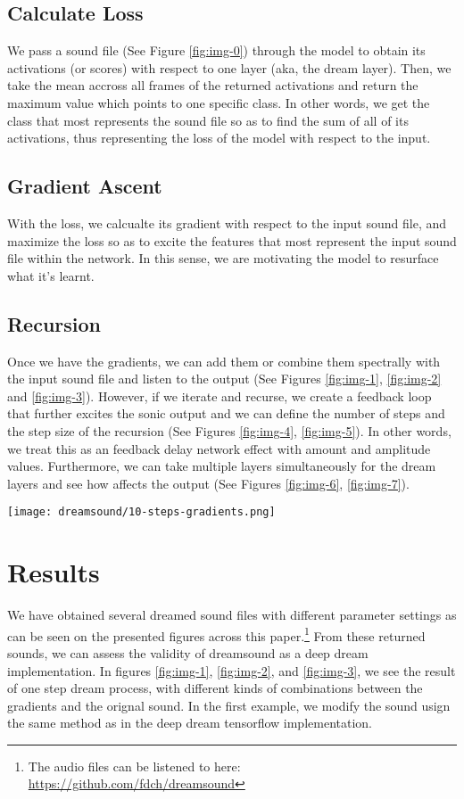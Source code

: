 \documentclass[a4paper,10pt,oneside]{article}
\begin{document}
\begin{sloppy}
\subsection{Calculate Loss}
We pass a sound file (See Figure \ref{fig:img-0}) through the model to obtain its activations (or scores) with respect to one layer (aka, the dream layer). Then, we take the mean accross all frames of the returned activations and return the maximum value which points to one specific class. In other words, we get the class that most represents the sound file so as to find the sum of all of its activations, thus representing the loss of the model with respect to the input.



\subsection{Gradient Ascent}
With the loss, we calcualte its gradient with respect to the input sound file, and maximize the loss so as to excite the features that most represent the input sound file within the network. In this sense, we are motivating the model to resurface what it's learnt. 


\subsection{Recursion}
Once we have the gradients, we can add them or combine them spectrally with the input sound file and listen to the output (See Figures \ref{fig:img-1}, \ref{fig:img-2} and \ref{fig:img-3}). However, if we iterate and recurse, we create a feedback loop that further excites the sonic output and we can define the number of steps and the step size of the recursion (See Figures \ref{fig:img-4}, \ref{fig:img-5}). In other words, we treat this as an feedback delay network effect with amount and amplitude values. Furthermore, we can take multiple layers simultaneously for the dream layers and see how affects the output (See Figures \ref{fig:img-6}, \ref{fig:img-7}).

\begin{figure*}[htbp]
       \centering
              \texttt{[image: dreamsound/10-steps-gradients.png]}
       \caption{Recursively passing the gradients for 10 steps.}
       \label{fig:img-4}
\end{figure*}

\section{Results}
We have obtained several dreamed sound files with different parameter settings as can be seen on the presented figures across this paper.\footnote{The audio files can be listened to here: \url{https://github.com/fdch/dreamsound}} From these returned sounds, we can assess the validity of dreamsound as a deep dream implementation. In figures \ref{fig:img-1}, \ref{fig:img-2}, and \ref{fig:img-3}, we see the result of one step dream process, with different kinds of combinations between the gradients and the orignal sound. In the first example, we modify the sound usign the same method as in the deep dream tensorflow implementation. 


\end{sloppy}
\end{document}
